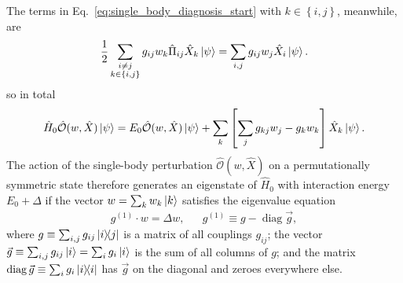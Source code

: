\documentclass[aps,pra,nofootinbib,twocolumn,superscriptaddress]{revtex4-2}
\newcommand{\f}[2]{\dfrac{#1}{#2}} %
\renewcommand{\sp}[1]{\left[#1\right]} %
\renewcommand{\set}[1]{\left\{#1\right\}} %
\newcommand{\1}{\mathds{1}}
\renewcommand{\H}{\hat H}
\renewcommand{\O}{\hat{\mathcal{O}}}
\DeclareMathOperator{\diag}{diag}
\begin{document}
The terms in Eq.~\eqref{eq:single_body_diagnosis_start} with
$k\in\set{i,j}$, meanwhile, are
\begin{align}
  \f12 \sum_{\substack{i\ne j\\k\in\set{i,j}}}
  g_{ij} w_k \hat\Pi_{ij} \hat X_k \ket\psi
  = \sum_{i,j} g_{ij} w_j \hat X_i \ket\psi.
\end{align}
so in total
\begin{align}
  \H_0 \O(w,\hat X) \ket\psi
  = E_0 \O(w,\hat X) \ket\psi
  + \sum_k \sp{\sum_j g_{kj} w_j - g_k w_k} \hat X_k \ket\psi.
\end{align}
The action of the single-body perturbation $\O(w,\hat X)$ on a permutationally symmetric state therefore generates an eigenstate of $\H_0$ with interaction energy $E_0+\Delta$ if the vector $w=\sum_k w_k \ket{k}$ satisfies the eigenvalue equation
\begin{align}
  g^{(1)} \cdot w = \Delta w, && g^{(1)} \equiv g - \diag\vec g,
  \label{eq:single_body_eig}
\end{align}
where $g \equiv\sum_{i,j} g_{ij} \op{i}{j}$ is a matrix of all couplings $g_{ij}$; the vector $\vec g \equiv \sum_{i,j} g_{ij} \ket{i} = \sum_i g_i \ket{i}$ is the sum of all columns of $g$; and the matrix $\diag\vec g \equiv \sum_i g_i \op{i}$ has $\vec g$ on the diagonal and zeroes everywhere else.
\end{document}
